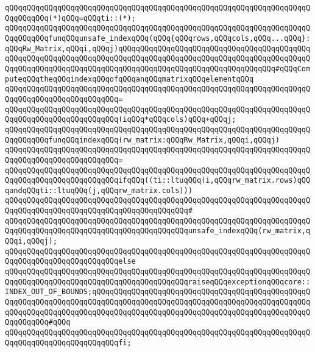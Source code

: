 \verb|qQQqqQQqqQQqqQQqqQQqqQQqqQQqqQQqqQQqqQQqqQQqqQQqqQQqqQQqqQQqqQQqqQQqqQQqqQQqqQQq(*)qQQq=qQQqti::(*);|\newline
\newline
\verb|qQQqqQQqqQQqqQQqqQQqqQQqqQQqqQQqqQQqqQQqqQQqqQQqqQQqqQQqqQQqqQQqqQQqqQQqqQQqqQQqfunqQQqunsafe_indexqQQq(qQQq{qQQqrows,qQQqcols,qQQq...qQQq}:qQQqRw_Matrix,qQQqi,qQQqj)qQQqqQQqqQQqqQQqqQQqqQQqqQQqqQQqqQQqqQQqqQQqqQQqqQQqqQQqqQQqqQQqqQQqqQQqqQQqqQQqqQQqqQQqqQQqqQQqqQQqqQQqqQQqqQQqqQQqqQQqqQQqqQQqqQQqqQQqqQQqqQQqqQQqqQQqqQQqqQQqqQQqqQQqqQQqqQQq#qQQqComputeqQQqtheqQQqindexqQQqofqQQqanqQQqmatrixqQQqelementqQQq|\newline
\verb|qQQqqQQqqQQqqQQqqQQqqQQqqQQqqQQqqQQqqQQqqQQqqQQqqQQqqQQqqQQqqQQqqQQqqQQqqQQqqQQqqQQqqQQqqQQqqQQq=|\newline
\verb|qQQqqQQqqQQqqQQqqQQqqQQqqQQqqQQqqQQqqQQqqQQqqQQqqQQqqQQqqQQqqQQqqQQqqQQqqQQqqQQqqQQqqQQqqQQqqQQq(iqQQq*qQQqcols)qQQq+qQQqj;|\newline
\newline
\verb|qQQqqQQqqQQqqQQqqQQqqQQqqQQqqQQqqQQqqQQqqQQqqQQqqQQqqQQqqQQqqQQqqQQqqQQqqQQqqQQqfunqQQqindexqQQq(rw_matrix:qQQqRw_Matrix,qQQqi,qQQqj)|\newline
\verb|qQQqqQQqqQQqqQQqqQQqqQQqqQQqqQQqqQQqqQQqqQQqqQQqqQQqqQQqqQQqqQQqqQQqqQQqqQQqqQQqqQQqqQQqqQQqqQQq=|\newline
\verb|qQQqqQQqqQQqqQQqqQQqqQQqqQQqqQQqqQQqqQQqqQQqqQQqqQQqqQQqqQQqqQQqqQQqqQQqqQQqqQQqqQQqqQQqqQQqqQQqifqQQq((ti::ltuqQQq(i,qQQqrw_matrix.rows)qQQqandqQQqti::ltuqQQq(j,qQQqrw_matrix.cols)))|\newline
\verb|qQQqqQQqqQQqqQQqqQQqqQQqqQQqqQQqqQQqqQQqqQQqqQQqqQQqqQQqqQQqqQQqqQQqqQQqqQQqqQQqqQQqqQQqqQQqqQQqqQQqqQQqqQQqqQQq#|\newline
\verb|qQQqqQQqqQQqqQQqqQQqqQQqqQQqqQQqqQQqqQQqqQQqqQQqqQQqqQQqqQQqqQQqqQQqqQQqqQQqqQQqqQQqqQQqqQQqqQQqqQQqqQQqqQQqqQQqunsafe_indexqQQq(rw_matrix,qQQqi,qQQqj);|\newline
\verb|qQQqqQQqqQQqqQQqqQQqqQQqqQQqqQQqqQQqqQQqqQQqqQQqqQQqqQQqqQQqqQQqqQQqqQQqqQQqqQQqqQQqqQQqqQQqqQQqelse|\newline
\verb|qQQqqQQqqQQqqQQqqQQqqQQqqQQqqQQqqQQqqQQqqQQqqQQqqQQqqQQqqQQqqQQqqQQqqQQqqQQqqQQqqQQqqQQqqQQqqQQqqQQqqQQqqQQqqQQqraiseqQQqexceptionqQQqcore::INDEX_OUT_OF_BOUNDS;qQQqqQQqqQQqqQQqqQQqqQQqqQQqqQQqqQQqqQQqqQQqqQQqqQQqqQQqqQQqqQQqqQQqqQQqqQQqqQQqqQQqqQQqqQQqqQQqqQQqqQQqqQQqqQQqqQQqqQQqqQQqqQQqqQQqqQQqqQQqqQQqqQQqqQQqqQQqqQQqqQQqqQQqqQQqqQQqqQQqqQQqqQQqqQQqqQQqqQQq#qQQq|\newline
\verb|qQQqqQQqqQQqqQQqqQQqqQQqqQQqqQQqqQQqqQQqqQQqqQQqqQQqqQQqqQQqqQQqqQQqqQQqqQQqqQQqqQQqqQQqqQQqqQQqfi;|\newline
